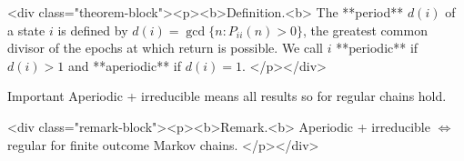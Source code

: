 <div class="theorem-block"><p><b>Definition.<b> 
The **period** $d(i)$ of a state $i$ is defined by $d(i) = \gcd\{n : P_{ii}(n) > 0\}$, the greatest common divisor of the epochs at which return is possible. We call $i$ **periodic** if $d(i) > 1$ and **aperiodic** if $d(i) = 1$.
</p></div>

\begin{newnotion}{Important}
Aperiodic + irreducible means all results so for regular chains hold.
\end{newnotion}

<div class="remark-block"><p><b>Remark.<b> 
Aperiodic + irreducible $\Leftrightarrow$ regular for finite outcome Markov chains.
</p></div>

